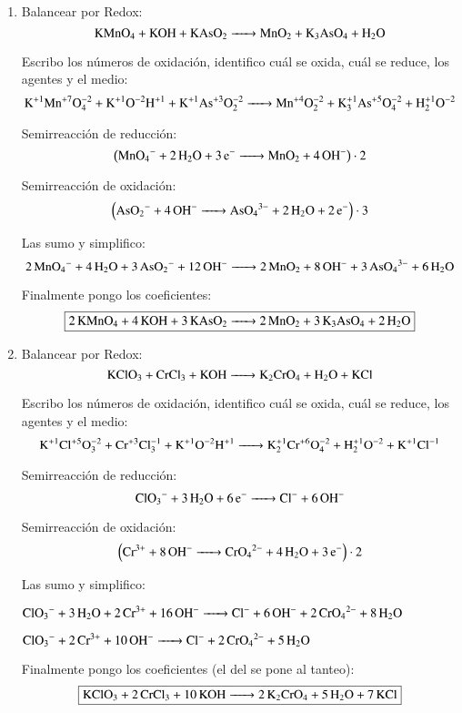 \begin{enumerate}
\newpage 
\item
Balancear por Redox:
$$\ce{
KMnO4 + KOH + KAsO2 ->
MnO2 + K3AsO4 + H2O
}$$

Escribo los números de oxidación, identifico cuál se oxida, cuál se reduce, los agentes y el medio:
\[\ce{
K^{+1}Mn^{+7}O^{-2}4 + K^{+1}O^{-2}H^{+1} + K^{+1}As^{+3}O^{-2}2 ->
Mn^{+4}O^{-2}2 + K^{+1}3As^{+5}O^{-2}4 + H^{+1}2O^{-2}
}\]


\begin{multicols}{2}
Semirreacción de reducción:
$$\left(\ce{
MnO4^- + 2H2O + 3e^- ->
MnO2 + 4OH^-
}\right)\cdot 2$$

Semirreacción de oxidación:
$$\left(\ce{
AsO2^- + 4OH^- ->
AsO_4^{3-} + 2H2O + 2e^-
}\right)\cdot 3$$
\end{multicols}

Las sumo y simplifico:
$$\ce{
2MnO4^- + 4 H2O + 3AsO2^- + 12 OH^- ->
2MnO2 + 8OH^- + 3 AsO4^{3-} + 6H2O
}$$

Finalmente pongo los coeficientes:
$$\fbox{\ce{
2KMnO4 + 4KOH + 3KAsO2 ->
2MnO2 + 3K3AsO4 + 2H2O
}}$$


\item
Balancear por Redox:
$$\ce{
KClO3 + CrCl3 + KOH ->
K2CrO4 + H2O + KCl
}$$

Escribo los números de oxidación, identifico cuál se oxida, cuál se reduce, los agentes y el medio:
$$\ce{
K^{+1}Cl^{+5}O^{-2}3 + Cr^{+3}Cl^{-1}3 + K^{+1}O^{-2}H^{+1} ->
K^{+1}2Cr^{+6}O^{-2}4 + H^{+1}2O^{-2} + K^{+1}Cl^{-1}
}$$


\begin{multicols}{2}
Semirreacción de reducción:
$$\ce{
ClO3^- + 3H2O + 6e^- ->
Cl^- + 6OH^-
}$$

Semirreacción de oxidación:
$$\left( \ce{
Cr^{3+} +8OH^- ->
CrO_4^{2-} + 4H2O + 3e^-
}\right) \cdot 2$$
\end{multicols}

Las sumo y simplifico:

\hfil$\ce{
ClO3^- + 3H2O + 2Cr^{3+} + 16OH^- ->
Cl^- + 6OH^- + 2CrO_4^{2-} + 8H2O
}$\hfil

\hfil$\ce{
ClO3^- + 2Cr^{3+} + 10OH^- ->
Cl^- + 2CrO_4^{2-} + 5H2O
}$\hfil

Finalmente pongo los coeficientes (el del  se pone al tanteo):
$$\fbox{\ce{
KClO3 + 2CrCl3 + 10KOH ->
2K2CrO4 + 5H2O + 7KCl
}}$$



\end{enumerate}
